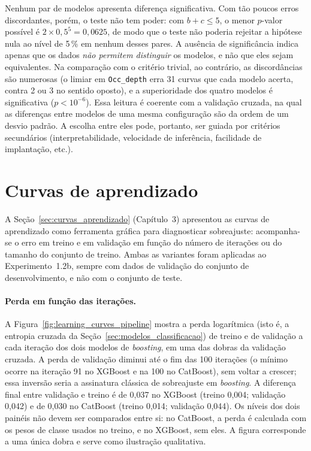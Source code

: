 Nenhum par de modelos apresenta diferença significativa. Com tão poucos erros discordantes, porém, o teste não tem poder: com $b + c \leq 5$, o menor $p$-valor possível é $2 \times 0{,}5^5 = 0{,}0625$, de modo que o teste não poderia rejeitar a hipótese nula ao nível de 5\,\% em nenhum desses pares. A ausência de significância indica apenas que os dados \emph{não permitem distinguir} os modelos, e não que eles sejam equivalentes. Na comparação com o critério trivial, ao contrário, as discordâncias são numerosas (o limiar em \texttt{Occ\_depth} erra 31 curvas que cada modelo acerta, contra 2 ou 3 no sentido oposto), e a superioridade dos quatro modelos é significativa ($p < 10^{-6}$). Essa leitura é coerente com a validação cruzada, na qual as diferenças entre modelos de uma mesma configuração são da ordem de um desvio padrão. A escolha entre eles pode, portanto, ser guiada por critérios secundários (interpretabilidade, velocidade de inferência, facilidade de implantação, etc.).

\section{Curvas de aprendizado}
\label{sec:curvas_aprendizado_exp}

A Seção~\ref{sec:curvas_aprendizado} (Capítulo~3) apresentou as curvas de aprendizado como ferramenta gráfica para diagnosticar sobreajuste: acompanha-se o erro em treino e em validação em função do número de iterações ou do tamanho do conjunto de treino. Ambas as variantes foram aplicadas ao Experimento~1.2b, sempre com dados de validação do conjunto de desenvolvimento, e não com o conjunto de teste.

\paragraph{Perda em função das iterações.} A Figura~\ref{fig:learning_curves_pipeline} mostra a perda logarítmica (isto é, a entropia cruzada da Seção~\ref{sec:modelos_classificacao}) de treino e de validação a cada iteração dos dois modelos de \textit{boosting}, em uma das dobras da validação cruzada. A perda de validação diminui até o fim das 100 iterações (o mínimo ocorre na iteração 91 no XGBoost e na 100 no CatBoost), sem voltar a crescer; essa inversão seria a assinatura clássica de sobreajuste em \textit{boosting}. A diferença final entre validação e treino é de 0,037 no XGBoost (treino 0,004; validação 0,042) e de 0,030 no CatBoost (treino 0,014; validação 0,044). Os níveis dos dois painéis não devem ser comparados entre si: no CatBoost, a perda é calculada com os pesos de classe usados no treino, e no XGBoost, sem eles. A figura corresponde a uma única dobra e serve como ilustração qualitativa.

